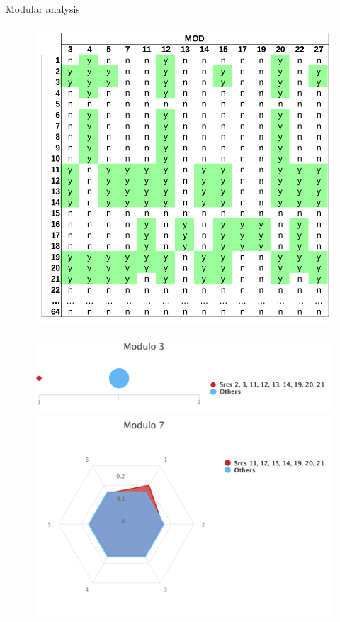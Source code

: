 \documentclass{beamer}
\begin{document}
\begin{darkframes}
    \begin{frame}{Modular analysis}
      \begin{figure}[H]
        \centering
        \begin{minipage}{.5\textwidth}
          \centering
          \includegraphics[width=0.96\linewidth]{../tex/images/mod_analysis}
        \end{minipage}%
        \begin{minipage}{.5\textwidth}
          \centering
          \includegraphics[width=0.96\linewidth]{../tex/images/analysis/mod3}
          \includegraphics[width=0.96\linewidth]{../tex/images/analysis/mod7}
        \end{minipage}
      \end{figure}     
      

\end{frame}
\end{darkframes}
\end{document}
